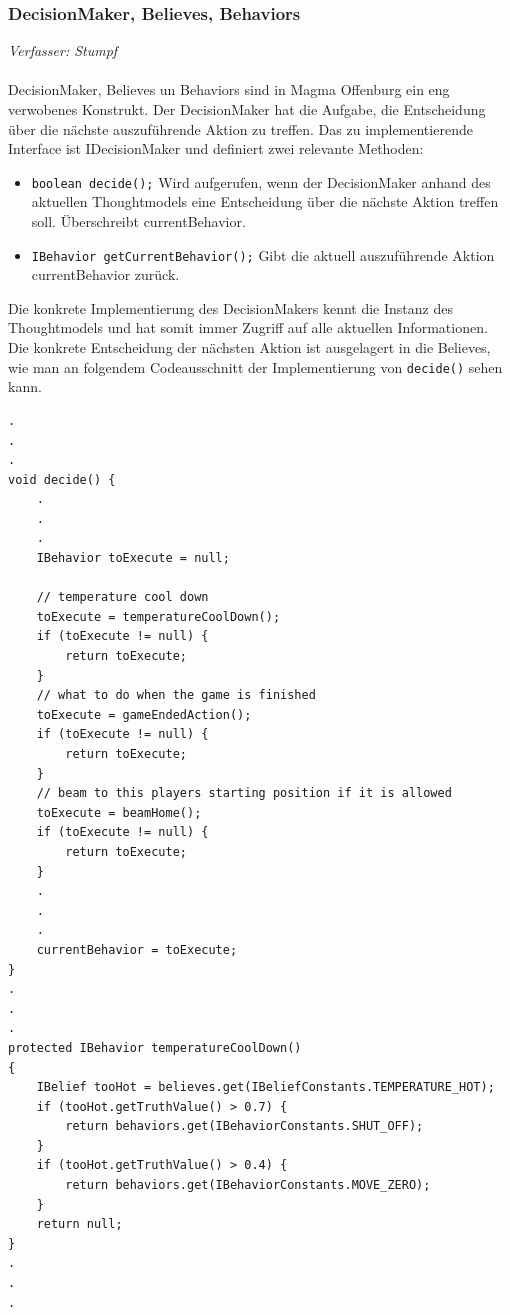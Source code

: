 \documentclass[fontsize=12pt,a4paper,final]{scrartcl}[2003/01/01]
\begin{document}
\subsubsection{DecisionMaker, Believes, Behaviors}
\textit{Verfasser: Stumpf}\\
\\
DecisionMaker, Believes un Behaviors sind in Magma Offenburg ein eng verwobenes Konstrukt. Der DecisionMaker hat die Aufgabe, die Entscheidung über die nächste auszuführende Aktion zu treffen. Das zu implementierende Interface ist IDecisionMaker und definiert zwei relevante Methoden:
\begin{itemize}
\item \texttt{boolean decide();} Wird aufgerufen, wenn der DecisionMaker anhand des aktuellen Thoughtmodels eine Entscheidung über die nächste Aktion treffen soll. Überschreibt currentBehavior.
\item \texttt{IBehavior getCurrentBehavior();} Gibt die aktuell auszuführende Aktion currentBehavior zurück.
\end{itemize}

Die konkrete Implementierung des DecisionMakers kennt die Instanz des Thoughtmodels und hat somit immer Zugriff auf alle aktuellen Informationen. Die konkrete Entscheidung der nächsten Aktion ist ausgelagert in die Believes, wie man an folgendem Codeausschnitt der Implementierung von \texttt{decide()} sehen kann.
\begin{lstlisting}[caption=Ausschnitt aus decide(), captionpos=b, label=lst:DecidionMaker - decide()]
.
.
.
void decide() {
	.
	.
	.
	IBehavior toExecute = null;

	// temperature cool down
	toExecute = temperatureCoolDown();
	if (toExecute != null) {
		return toExecute;
	}
	// what to do when the game is finished
	toExecute = gameEndedAction();
	if (toExecute != null) {
		return toExecute;
	}
	// beam to this players starting position if it is allowed
	toExecute = beamHome();
	if (toExecute != null) {
		return toExecute;
	}
	.
	.
	.
	currentBehavior = toExecute;
}
.
.
.
protected IBehavior temperatureCoolDown()
{
	IBelief tooHot = believes.get(IBeliefConstants.TEMPERATURE_HOT);
	if (tooHot.getTruthValue() > 0.7) {
		return behaviors.get(IBehaviorConstants.SHUT_OFF);
	}
	if (tooHot.getTruthValue() > 0.4) {
		return behaviors.get(IBehaviorConstants.MOVE_ZERO);
	}
	return null;
}
.
.
.
\end{lstlisting}
\end{document}
